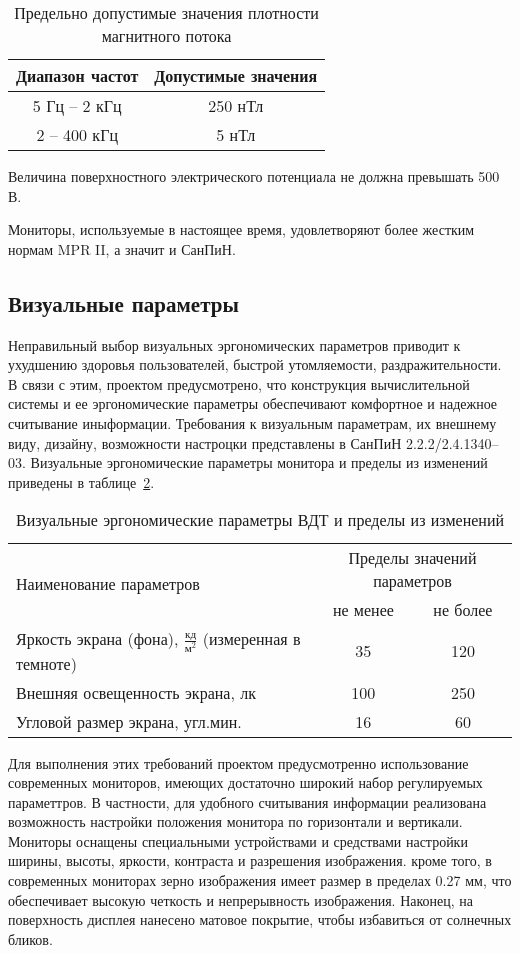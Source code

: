 \begin{table}[ht]
\caption{Предельно допустимые значения плотности магнитного потока}
\begin{tabular}{|c|c|}
\hline
Диапазон частот& Допустимые значения \\
\hline
5 Гц -- 2 кГц & 250 нТл \\
\hline
2 -- 400 кГц& 5 нТл \\
\hline
\end{tabular}
\label{tab:ro}
\end{table}

Величина поверхностного электрического потенциала не должна превышать 500 В.

Мониторы, используемые в настоящее время, удовлетворяют более жестким нормам MPR II, а значит и СанПиН.

\subsection{Визуальные параметры}

Неправильный выбор визуальных эргономических параметров приводит к ухудшению здоровья пользователей, быстрой утомляемости, раздражительности. В связи с этим, проектом предусмотрено, что конструкция вычислительной системы и ее эргономические параметры обеспечивают комфортное и надежное считывание иныформации. Требования к визуальным параметрам, их внешнему виду, дизайну, возможности настроцки представлены в СанПиН 2.2.2/2.4.1340--03. Визуальные эргономические параметры монитора и пределы из изменений приведены в таблице~\ref{tab:ergonom}.

\begin{table}[ht]
\caption{Визуальные эргономические параметры ВДТ и пределы из изменений}
\begin{tabular}{|p{}|c|c|}
\hline
\multirow{2}{*}{Наименование параметров} & \multicolumn{2}{c|}{Пределы значений параметров}\\
\cline{2-3}
&не менее&не более\\
\hline
Яркость экрана (фона), $\frac{\text{кд}}{\text{м}^2}$ (измеренная в темноте) &35&120\\
\hline
Внешняя освещенность экрана, лк &100&250\\
\hline
Угловой размер экрана, угл.мин. &16&60\\
\hline
\end{tabular}
\label{tab:ergonom}
\end{table}

Для выполнения этих требований проектом предусмотренно использование современных мониторов, имеющих достаточно широкий набор регулируемых параметтров.  В частности, для удобного считывания информации реализована возможность настройки положения монитора по горизонтали и вертикали. Мониторы оснащены специальными устройствами и средствами настройки ширины, высоты, яркости, контраста и разрешения изображения. кроме того, в современных мониторах зерно изображения имеет размер в пределах 0.27 мм, что обеспечивает высокую четкость и непрерывность изображения. Наконец, на поверхность дисплея нанесено матовое покрытие, чтобы избавиться от солнечных бликов.

